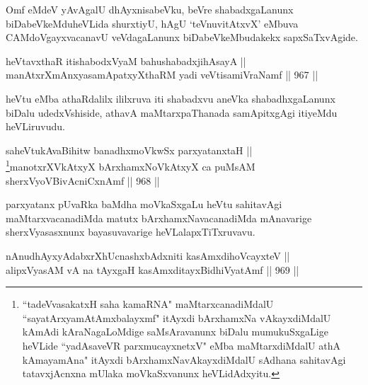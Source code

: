 
\begin{artha}
Omf eMdeV yAvAgalU dhAyxnisabeVku, beVre shabadxgaLanunx biDabeVkeMduheVLida shurxtiyU, hAgU `teV\s nuvitAtxvX' eMbuva CAMdoVgayxvacanavU veVdagaLanunx biDabeVkeMbudakekx sapxSaTxvAgide.
\end{artha}


\begin{shl}
heVtavxthaR itishabodxV\s yaM bahushabadxjihAsayA || \\
manAtxrXmAnxyasamApatxyXthaRM yadi veVtisamiVraNamf \hfill || 967 ||  
\end{shl}

\begin{artha}
heVtu eMba athaRdalilx ililxruva iti shabadxvu aneVka shabadhxgaLanunx biDalu udedxVshiside, athavA maMtarxpaThanada samApitxgAgi itiyeMdu heVLiruvudu.
\end{artha}


\begin{shl}
saheVtukAvaBihitw banadhxmoVkwSx parxyatanxtaH || \\
\footnote{``tadeVvasakatxH saha kamaRNA" maMtarxcanadiMdalU ``sayatArxyamAtAmx\s balayxmf" itAyxdi bArxhamxNa vAkayxdiMdalU kAmAdi kAraNagaLoMdige saMsAravanunx biDalu mumukuSxgaLige heVLide ``yadAsaveVR parxmucayxnetxV" eMba maMtarxdiMdalU athA kAmayamAna" itAyxdi bArxhamxNavAkayx\-diMdalU sAdhana sahitavAgi tatavxjAcnxna mUlaka moVkaSxvanunx heVLidAdxyitu.}manotxrXVkAtxyX bArxhamxNoVkAtxyX ca puMsAM sherxVyoVBivAcniCxnAmf \hfill || 968 ||  
\end{shl}


\begin{artha}
parxyatanx pUvaRka baMdha moVkaSxgaLu heVtu sahitavAgi maMtarxvacanadiMda matutx bArxhamxNavacanadiMda mAnavarige sherxVyasasxnunx bayasuvavarige heVLalapxTiTxruvavu.
\end{artha}


\begin{shl}
nAnudhAyxyAdabxrXhUcnashxbAdxniti kasAmxdihoVcayxteV || \\
alipxVyasAM vA na tAyxgaH kasAmxditayxBidhiVyatAmf \hfill || 969 ||  
\end{shl}

